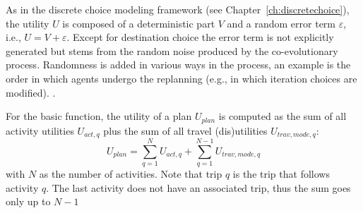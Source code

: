 As in the discrete choice modeling framework (see Chapter~\ref{ch:discretechoice}), the utility $U$ is composed of a deterministic part $V$ and a random error term $\varepsilon$, i.e., $U = V + \varepsilon$. Except for destination choice the error term is not explicitly generated but stems from the random noise produced by the co-evolutionary process. Randomness is added in various ways in the process, an example is the order in which agents undergo the replanning (e.g., in which iteration choices are modified). .

For the basic function, the utility of a plan $U_{plan}$ is computed as the sum of all activity utilities $U_{act,q}$ plus the sum of all travel (dis)utilities $U_{trav,mode, q}$:
%
\begin{equation}
\label{eq:matsimUTF}
U_{plan}=\sum^N_{q=1} U_{act,q} + \sum^{N-1}_{q=1} U_{trav, mode, q}
\end{equation}
with $N$ as the number of activities. Note that trip $q$ is the trip that follows activity $q$. The last activity does not have an associated trip, thus the sum goes only up to $N-1$

